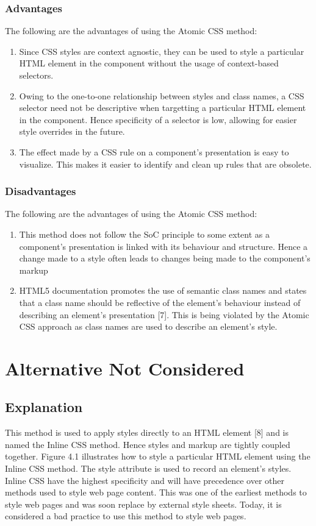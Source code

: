 \documentclass[12pt]{article}
\begin{document}
\subsubsection{Advantages}
The following are the advantages of using the Atomic CSS method:
\begin{enumerate}
	\item Since CSS styles are context agnostic, they can be used to style a particular HTML element in the component without the usage of context-based selectors.

	\item Owing to the one-to-one relationship between styles and class names, a CSS selector need not be descriptive when targetting a particular HTML element in the component. Hence specificity of a selector is low, allowing for easier style overrides in the future.

	\item The effect made by a CSS rule on a component's presentation is easy to visualize. This makes it easier to identify and clean up rules that are obsolete.
\end{enumerate}


\subsubsection{Disadvantages}
The following are the advantages of using the Atomic CSS method:
\begin{enumerate}
	\item This method does not follow the SoC principle to some extent as a component's presentation is linked with its behaviour and structure. Hence a change made to a style often leads to changes being made to the component's markup

	\item HTML5 documentation promotes the use of semantic class names and states that a class name should be reflective of the element's behaviour instead of describing an element's presentation [7]. This is being violated by the Atomic CSS approach as class names are used to describe an element's style.
\end{enumerate}

\newpage

\section{Alternative Not Considered}
\subsection{Explanation}
This method is used to apply styles directly to an HTML element [8] and is named the Inline CSS method. Hence styles and markup are tightly coupled together. Figure 4.1 illustrates how to style a particular HTML element using the Inline CSS method. The style attribute is used to record an element's styles. Inline CSS have the highest specificity and will have precedence over other methods used to style web page content. This was one of the earliest methods to style web pages and was soon replace by external style sheets. Today, it is considered a bad practice to use this method to style web pages.
\end{document}
